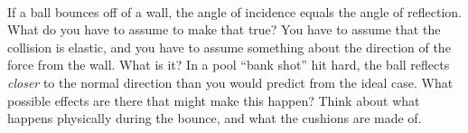 \documentclass[12pt]{article}
\begin{document}
\paragraph{\theproblem}%
If a ball bounces off of a wall, the angle of incidence equals the
angle of reflection.  What do you have to assume to make that true?
You have to assume that the collision is elastic, and you have to
assume something about the direction of the force from the wall.  What
is it?  In a pool ``bank shot'' hit hard, the ball reflects
\emph{closer} to the normal direction than you would predict from the
ideal case.  What possible effects are there that might make this
happen?  Think about what happens physically during the bounce, and
what the cushions are made of.
\end{document}
